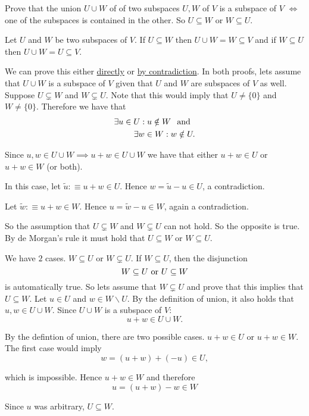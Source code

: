 \setcounter{xrcscount}{11}
\begin{xrcs}
  Prove that the union $U \cup W$ of of two subspaces $U, W$ of $V$ is a subspace of $V$ $\iff$ one of the subspaces is contained in the other. So $U\subseteq W$ or $W \subseteq U$.

  \begin{xprf}
    \Leftarrowdirection Let $U$ and $W$ be two subspaces of $V$. If $U \subseteq W$ then $U \cup W = W \subseteq V$ and if $W \subseteq U$ then $U \cup W = U \subseteq V$.

    \Rightarrowdirection We can prove this either \underline{directly} or \underline{by contradiction}. In both proofs, lets assume that $U \cup W$ is a subspace of $V$ given that $U$ and $W$ are subspaces of $V$ as well. \\
     Suppose $U \subsetneq W$ and $W \subsetneq U$. Note that this would imply that $U \neq \{0\}$ and $W \neq \{0\}$. Therefore we have that
    \[
    \begin{aligned}
      \exists u \in U: u \notin W \;\;\, \text{and}\;\; \\
      \exists w \in W: w \notin U.
    \end{aligned}
    \]

    Since $u,w \in U \cup W \implies u+w \in U \cup W $ we have that either $u+w \in U$ or $u+w \in W$ (or both).
    \begin{description}
      \item{} In this case, let $\widetilde u :\equiv u + w \in U$. Hence $w = \widetilde{u} - u \in U$, a contradiction.
      \item{} Let $\widetilde w :\equiv u + w \in W$. Hence $u = \widetilde{w} - u \in W$, again a contradiction.
    \end{description}

    So the assumption that $U \subsetneq W$ and $W \subsetneq U$ can not hold. So the opposite is true. By de Morgan's rule it must hold that $U \subseteq W$ or $W \subseteq U$.

     We have $2$ cases. $W \subseteq U$ or $W \subsetneq U$. If $W \subseteq U$, then the disjunction \[
    W \subseteq U $ or $ U \subseteq W
    \]
    is automatically true. So lets assume that $W \subsetneq U$ and prove that this implies that $U \subseteq W$.
    Let $u \in U$ and $w \in W \backslash U$. By the definition of union, it also holds that $u,w \in U \cup W$. Since $U \cup W$ is a subspace of $V$:
    \[
    u+w \in U \cup W.
    \]

    By the defintion of union, there are two possible cases. $u+w \in U$ or $u+w \in W$. The first case would imply
    \[
    w = (u+w) + (-u) \in U,
    \]

    which is impossible. Hence $u+w \in W$ and therefore
    \[
    u= (u+w) -w \in W
    \]

    Since $u$ was arbitrary, $U \subseteq W$.
  \end{xprf}
\end{xrcs}


